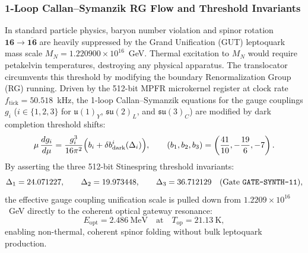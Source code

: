 \documentclass[11pt,onecolumn]{article}
\begin{document}
\subsubsection{1-Loop Callan--Symanzik RG Flow and Threshold Invariants}
In standard particle physics, baryon number violation and spinor rotation $\mathbf{16} \to \overline{\mathbf{16}}$ are heavily suppressed by the Grand Unification (GUT) leptoquark mass scale $M_N = 1.220900\times 10^{16}$~GeV. Thermal excitation to $M_N$ would require petakelvin temperatures, destroying any physical apparatus. The translocator circumvents this threshold by modifying the boundary Renormalization Group (RG) running. Driven by the 512-bit MPFR microkernel register at clock rate $f_{\text{tick}} = 50.518$~kHz, the 1-loop Callan--Symanzik equations for the gauge couplings $g_i$ ($i \in \{1, 2, 3\}$ for $\mathfrak{u}(1)_Y$, $\mathfrak{su}(2)_L$, and $\mathfrak{su}(3)_C$) are modified by dark completion threshold shifts:
\begin{equation}
\mu\,\frac{dg_i}{d\mu} = \frac{g_i^3}{16\pi^2}\Bigl(b_i + \delta b_{\text{dark}}^i(\Delta_i)\Bigr), \qquad (b_1, b_2, b_3) = \left(\frac{41}{10}, -\frac{19}{6}, -7\right).
\label{eq:callan_symanzik}
\end{equation}
By asserting the three 512-bit Stinespring threshold invariants:
\begin{equation}
\Delta_1 = 24.071227, \qquad \Delta_2 = 19.973448, \qquad \Delta_3 = 36.712129 \quad (\text{Gate \texttt{GATE-SYNTH-11}}),
\label{eq:cs_invariants}
\end{equation}
the effective gauge coupling unification scale is pulled down from $1.2209\times 10^{16}$~GeV directly to the coherent optical gateway resonance:
\begin{equation}
E_{\text{opt}} = 2.486~\text{MeV} \quad \text{at} \quad T_{\text{op}} = 21.13~\text{K},
\label{eq:optical_gateway_energy}
\end{equation}
enabling non-thermal, coherent spinor folding without bulk leptoquark production.
\end{document}
